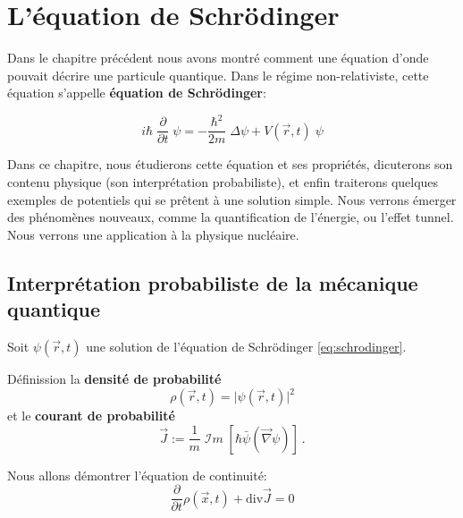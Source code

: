 \documentclass{book}
\begin{document}
\chapter{L'équation de Schrödinger}\label{chap:chap3}

Dans le chapitre précédent nous avons montré comment une équation d'onde pouvait décrire une particule quantique.
Dans le régime non-relativiste, cette équation s'appelle \textbf{équation de Schrödinger}:

\begin{equation}\label{eq:schrodinger}
  i\hbar\;  \dfrac{\partial}{\partial t}\;  \psi = -\dfrac{\hbar ^2}{2m} \; \Delta \psi + V(\vec r, t) \;  \psi 
\end{equation}



Dans ce chapitre, nous étudierons cette équation et ses propriétés, dicuterons 
 son contenu physique (son interprétation probabiliste), et enfin traiterons quelques exemples de
potentiels qui se prêtent à une solution simple.  
Nous verrons émerger des phénomènes nouveaux, comme la quantification de l'énergie, ou l'effet tunnel. Nous verrons une application à la physique nucléaire.





\section{Interprétation probabiliste de la mécanique quantique}

Soit $\psi(\vec r, t)$ une solution de l'équation de Schrödinger \eqref{eq:schrodinger}.

Définission la {\bf densité de probabilité}
\begin{equation}
\label{eq:densite_proba}
\rho(\vec r, t)= \vert \psi(\vec r, t) \vert^2
\end{equation}
et le {\bf courant de probabilité}
\begin{equation} \label{eq:courant_proba}
\vec J := \dfrac{1}{m} \; \mathcal{I}m \;\left[\hbar \bar{\psi}(\vec \nabla \psi)\right] \ .
\end{equation} 

Nous allons démontrer l'équation de continuité:
\begin{equation} \label{eq:continuite_proba}
\boxed{\dfrac{\partial}{\partial t} \rho(\vec x, t) + \mathrm{div} \vec J = 0}
\end{equation}
\end{document}
